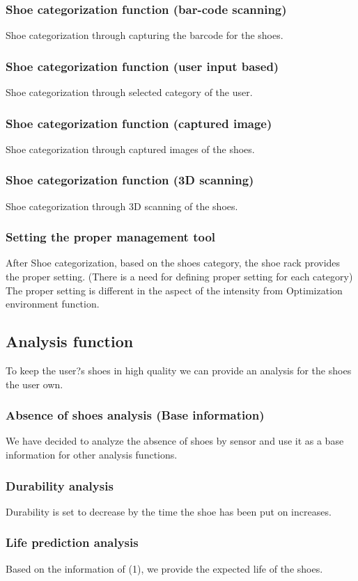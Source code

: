 \documentclass[conference]{IEEEtran}
\begin{document}
\subsubsection{Shoe categorization function (bar-code scanning)}
Shoe categorization through capturing the barcode for the shoes.
\subsubsection{Shoe categorization function (user input based)}
Shoe categorization through selected category of the user.
\subsubsection{Shoe categorization function (captured image)}
Shoe categorization through captured images of the shoes.
\subsubsection{Shoe categorization function (3D scanning)}
Shoe categorization through 3D scanning of the shoes.
\subsubsection{Setting the proper management tool}
After Shoe categorization, based on the shoes category, the shoe rack provides the proper setting.
(There is a need for defining proper setting for each category)
The proper setting is different in the aspect of the intensity from Optimization environment function.


\subsection{Analysis function}
To keep the user?s shoes in high quality we can provide an analysis for the shoes the user own.
\subsubsection{Absence of shoes analysis (Base information)}
We have decided to analyze the absence of shoes by sensor and use it as a base information for other analysis functions.
\subsubsection{Durability analysis}
Durability is set to decrease by the time the shoe has been put on increases. 
\subsubsection{Life prediction analysis}
Based on the information of (1), we provide the expected  life of the shoes.
\end{document}
